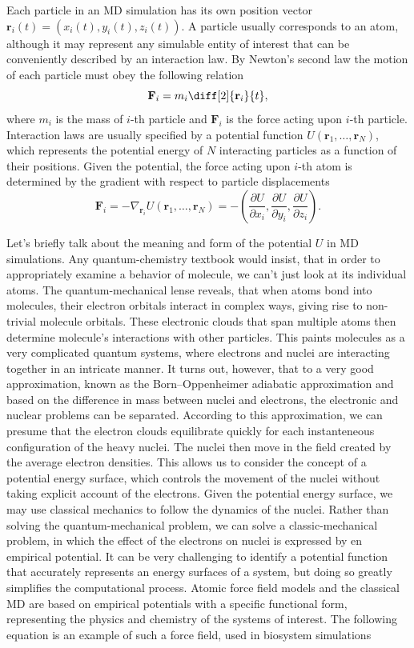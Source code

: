 Each particle in an MD simulation has its own position vector
$\mathbf{r}_i(t) = (x_i(t), y_i(t), z_i(t))$. A particle usually corresponds
to an atom, although it may represent any simulable entity of interest that
can be conveniently described by an interaction law. By Newton's second law
the motion of each particle must obey the following relation
\begin{equation}
  \mathbf{F}_i = m_i \diff[2]{\mathbf{r}_i}{t},
\end{equation}
where $m_i$ is the mass of $i$-th particle and $\mathbf{F}_i$ is the
force acting upon $i$-th particle. Interaction laws are usually specified by
a potential function $U(\mathbf{r}_1, \dots, \mathbf{r}_N)$, which represents
the potential energy of $N$ interacting particles as a function of their
positions. Given the potential, the force acting upon $i$-th atom is
determined by the gradient with respect to particle displacements
\begin{equation}
  \mathbf{F}_i = - \nabla_{\mathbf{r}_i} U(\mathbf{r}_1, \dots, \mathbf{r}_N)
  = - \left(
    \frac{\partial U}{\partial x_i},
    \frac{\partial U}{\partial y_i},
    \frac{\partial U}{\partial z_i}
  \right).
\end{equation}

Let's briefly talk about the meaning and form of the potential $U$
in MD simulations. Any quantum-chemistry textbook would insist, that in order
to appropriately examine a behavior of molecule, we can't just look at its
individual atoms. The quantum-mechanical lense reveals, that when atoms bond
into molecules, their electron orbitals interact in complex ways, giving rise
to non-trivial molecule orbitals. These electronic clouds that span multiple
atoms then determine molecule's interactions with other particles. This paints
molecules as a very complicated quantum systems, where electrons and nuclei
are interacting together in an intricate manner. It turns out, however, that
to a very good approximation, known as the Born–Oppenheimer adiabatic
approximation and based on the difference in mass between nuclei and
electrons, the electronic and nuclear problems can be separated. According to
this approximation, we can presume that the electron clouds equilibrate
quickly for each instanteneous configuration of the heavy nuclei. The nuclei
then move in the field created by the average electron densities.
This allows us to consider the concept of a potential energy surface, which
controls the movement of the nuclei without taking explicit account of the
electrons. Given the potential energy surface, we may use classical mechanics
to follow the dynamics of the nuclei. Rather than solving the
quantum-mechanical problem, we can solve a classic-mechanical problem, in
which the effect of the electrons on nuclei is expressed by en empirical
potential. It can be very challenging to identify a potential function that
accurately represents an energy surfaces of a system, but doing so greatly
simplifies the computational process. Atomic force field models and the
classical MD are based on empirical potentials with a specific functional
form, representing the physics and chemistry of the systems of
interest. The following equation is an example of such a force field, used in
biosystem simulations


